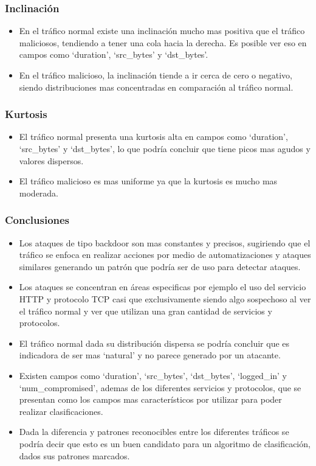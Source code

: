 \documentclass[12pt,a4paper]{article}
\begin{document}
\subsubsection{Inclinación}

\begin{itemize}
  \item En el tráfico normal existe una inclinación mucho mas positiva que el tráfico maliciosos, tendiendo a tener una cola hacia la derecha.
    Es posible ver eso en campos como `duration', `src_bytes' y `dst_bytes'.
  \item En el tráfico malicioso, la inclinación tiende a ir cerca de cero o negativo, siendo distribuciones mas concentradas en comparación al tráfico normal.
\end{itemize}

\subsubsection{Kurtosis}

\begin{itemize}
  \item El tráfico normal presenta una kurtosis alta en campos como `duration', `src_bytes' y `dst_bytes', lo que podría concluir que tiene picos mas agudos y valores dispersos.
  \item El tráfico malicioso es mas uniforme ya que la kurtosis es mucho mas moderada.
\end{itemize}

\subsubsection{Conclusiones}

\begin{itemize}
  \item Los ataques de tipo backdoor son mas constantes y precisos, sugiriendo que el tráfico se enfoca en realizar acciones por medio de automatizaciones y ataques similares generando un patrón que podría ser de uso para detectar ataques.
  \item Los ataques se concentran en áreas especificas por ejemplo el uso del servicio HTTP y protocolo TCP casi que exclusivamente siendo algo sospechoso al ver el tráfico normal y ver que utilizan una gran cantidad de servicios y protocolos.
  \item El tráfico normal dada su distribución dispersa se podría concluir que es indicadora de ser mas `natural' y no parece generado por un atacante.
  \item Existen campos como `duration', `src_bytes', `dst_bytes', `logged_in' y `num_compromised', ademas de los diferentes servicios y protocolos, que se presentan como los campos mas característicos por utilizar para poder realizar clasificaciones.
  \item Dada la diferencia y patrones reconocibles entre los diferentes tráficos se podría decir que esto es un buen candidato para un algoritmo de clasificación, dados sus patrones marcados.
\end{itemize}
\end{document}
